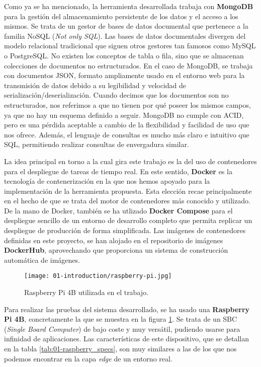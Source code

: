 Como ya se ha mencionado, la herramienta desarrollada trabaja con
\textbf{MongoDB} para la gestión del almacenamiento persistente de los datos y
el acceso a los mismos. Se trata de un gestor de bases de datos documental que
pertenece a la familia NoSQL (\textit{Not only SQL}). Las bases de datos
documentales divergen del modelo relacional tradicional que siguen otros
gestores tan famosos como MySQL o PostgreSQL. No existen los conceptos de tabla
o fila, sino que se almacenan colecciones de documentos no estructurados. En el
caso de MongoDB, se trabaja con documentos JSON, formato ampliamente usado en el
entorno web para la transmisión de datos debido a su legibilidad y velocidad de
serialización/deserialización. Cuando decimos que los documentos son no
estructurados, nos referimos a que no tienen por qué poseer los mismos campos,
ya que no hay un esquema definido a seguir. MongoDB no cumple con ACID, pero es
una pérdida aceptable a cambio de la flexibilidad y facilidad de uso que nos
ofrece. Además, el lenguaje de consultas es mucho más claro e intuitivo que SQL,
permitiendo realizar consultas de envergadura similar.

La idea principal en torno a la cual gira este trabajo es la del uso de
contenedores para el despliegue de tareas de tiempo real. En este sentido,
\textbf{Docker} es la tecnología de contenerización en la que nos hemos apoyado
para la implementación de la herramienta propuesta. Esta elección recae
principalmente en el hecho de que se trata del motor de contenedores más
conocido y utilizado. De la mano de Docker, también se ha utlizado
\textbf{Docker Compose} para el despliegue sencillo de un entorno de desarrollo
completo que permita replicar un despliegue de producción de forma simplificada.
Las imágenes de contenedores definidas en este proyecto, se han alojado en el
repositorio de imágenes \textbf{DockerHub}, aprovechando que proporciona un
sistema de construcción automática de imágenes.

\begin{figure}
      \centering
      \texttt{[image: 01-introduction/raspberry-pi.jpg]}
      \caption{Raspberry Pi 4B utilizada en el trabajo.}
      \label{fig:01-raspberry_pi}
\end{figure}

Para realizar las pruebas del sistema desarrollado, se ha usado una
\textbf{Raspberry Pi 4B}, concretamente la que se muestra en la figura
\ref{fig:01-raspberry_pi}. Se trata de un SBC (\textit{Single Board Computer})
de bajo coste y muy versátil, pudiendo usarse para infinidad de aplicaciones.
Las características de este dispositivo, que se detallan en la tabla
\ref{tab:01-raspberry_specs}, son muy similares a las de los que nos podemos
encontrar en la capa \textit{edge} de un entorno real.

